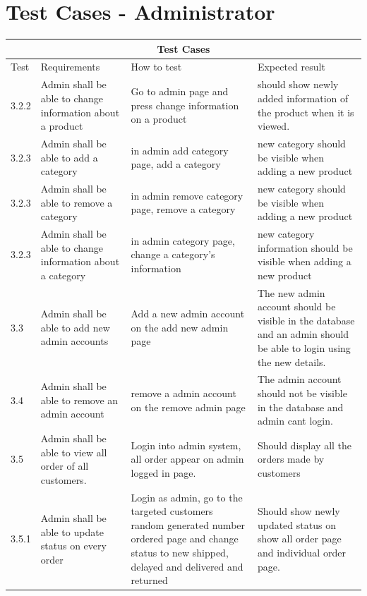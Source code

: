 \documentclass[a4paper,12pt]{article}
\begin{document}
	\newpage
	\section{Test Cases - Administrator}
	
		\begin{tabular}{ |p{1cm}||p{4cm}|p{4cm}|p{4cm}|  }
			\hline
			\multicolumn{4}{|c|}{Test Cases} \\
			\hline
			Test& Requirements &How to test&Expected result\\
			\hline
			
			3.2.2 & Admin shall be able to change information about a product & Go to admin page and press change information on a product & should show newly added information of the product when it is viewed. \\
			\hline
			3.2.3 & Admin shall be able to add a category & in admin add category page, add a category & new category should be visible when adding a new product \\
			\hline
			3.2.3 & Admin shall be able to remove a category & in admin remove category page, remove a category & new category should be visible when adding a new product \\
			\hline
			3.2.3 & Admin shall be able to change information about a category & in admin category page, change a category's information & new category information should be visible when adding a new product \\
			\hline
			3.3 & Admin shall be able to add new admin accounts & Add a new admin account on the add new admin page & The new admin account should be visible in the database and an admin should be able to login using the new details.\\
			\hline
			3.4 & Admin shall be able to remove an admin account & remove a admin account on the remove admin page & The admin account should not be visible in the database and admin cant login. \\
			\hline
			3.5 & Admin shall be able to view all order of all customers. & Login into admin system, all order appear on admin logged in page. & Should display all the orders made by customers \\
			\hline
			3.5.1
			& Admin shall be able to update status on every order & Login as admin, go to the targeted customers random generated number ordered page and change status to new shipped, delayed and delivered and returned & Should show newly updated status on show all order page and individual order page. \\ 
			\hline
			
			
		\end{tabular}
		
			
		

	
\end{document}
